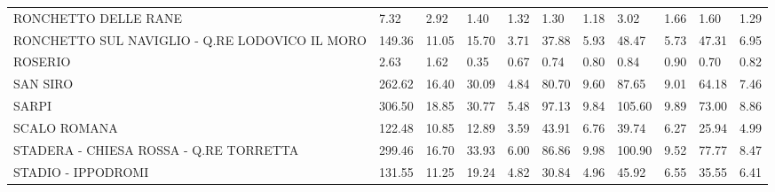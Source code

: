 \begin{table}[H]
{{\begin{tabular}{lp{1.3cm}p{1.3cm}p{1.3cm}p{1.3cm}p{1.3cm}p{1.3cm}p{1.3cm}p{1.3cm}p{1.3cm}p{1.3cm}}
RONCHETTO DELLE RANE                               &                      7.32 &                  2.92 &                        1.40 &                    1.32 &                        1.30 &                    1.18 &                        3.02 &                    1.66 &                      1.60 &                  1.29 \\
RONCHETTO SUL NAVIGLIO - Q.RE LODOVICO IL MORO     &                    149.36 &                 11.05 &                       15.70 &                    3.71 &                       37.88 &                    5.93 &                       48.47 &                    5.73 &                     47.31 &                  6.95 \\
ROSERIO                                            &                      2.63 &                  1.62 &                        0.35 &                    0.67 &                        0.74 &                    0.80 &                        0.84 &                    0.90 &                      0.70 &                  0.82 \\
SAN SIRO                                           &                    262.62 &                 16.40 &                       30.09 &                    4.84 &                       80.70 &                    9.60 &                       87.65 &                    9.01 &                     64.18 &                  7.46 \\
SARPI                                              &                    306.50 &                 18.85 &                       30.77 &                    5.48 &                       97.13 &                    9.84 &                      105.60 &                    9.89 &                     73.00 &                  8.86 \\
SCALO ROMANA                                       &                    122.48 &                 10.85 &                       12.89 &                    3.59 &                       43.91 &                    6.76 &                       39.74 &                    6.27 &                     25.94 &                  4.99 \\
STADERA - CHIESA ROSSA - Q.RE TORRETTA  &                    299.46 &                 16.70 &                       33.93 &                    6.00 &                       86.86 &                    9.98 &                      100.90 &                    9.52 &                     77.77 &                  8.47 \\
STADIO - IPPODROMI                                 &                    131.55 &                 11.25 &                       19.24 &                    4.82 &                       30.84 &                    4.96 &                       45.92 &                    6.55 &                     35.55 &                  6.41 \\

\end{tabular}}}
\end{table}
